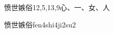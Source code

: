 \begin{entry}{愤世嫉俗}{12,5,13,9}{⼼、⼀、⼥、⼈}
  \begin{phonetics}{愤世嫉俗}{fen4shi4ji2su2}
  \end{phonetics}
\end{entry}
